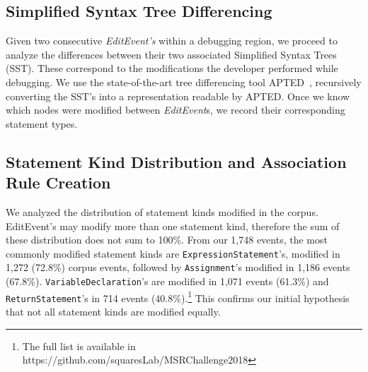 \documentclass[sigconf]{acmart}
\begin{document}
\subsection{Simplified Syntax Tree Differencing}
\label{sstDiff}

Given two consecutive \textit{EditEvent's} within
a debugging region, we proceed to analyze the differences
between their two associated Simplified Syntax Trees (SST).
These correspond to the modifications the developer performed
while debugging.
We use the 
state-of-the-art tree differencing
tool APTED~\cite{Pawlik16Apted}, recursively converting the SST's into a
representation readable by APTED. 
Once we know which nodes were modified between \textit{EditEvent}s, we record
their corresponding statement types. 

\subsection{Statement Kind Distribution and Association Rule Creation}

We analyzed the distribution of statement kinds modified
in the corpus.  EditEvent's may modify more than one
statement kind, therefore the sum of these distribution
does not sum to 100\%.
From our 1,748 events, the most commonly modified statement
kinds are \texttt{ExpressionStatement}'s, modified in 1,272 (72.8\%) 
corpus events,
followed by \texttt{Assignment}'s modified in 1,186 
events (67.8\%). \texttt{VariableDeclaration}'s are modified in 1,071
events (61.3\%) and \texttt{ReturnStatement}'s in 714
events (40.8\%).\footnote{The full list is available in 
https://github.com/squaresLab/MSRChallenge2018} This confirms our initial hypothesis that
not all statement kinds are modified equally.


\end{document}
